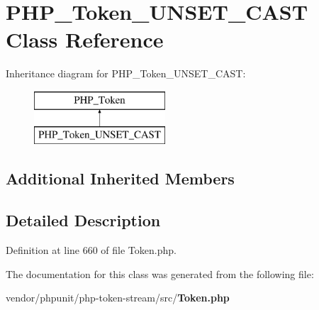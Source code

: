 \section{P\+H\+P\+\_\+\+Token\+\_\+\+U\+N\+S\+E\+T\+\_\+\+C\+A\+S\+T Class Reference}
\label{class_p_h_p___token___u_n_s_e_t___c_a_s_t}
Inheritance diagram for P\+H\+P\+\_\+\+Token\+\_\+\+U\+N\+S\+E\+T\+\_\+\+C\+A\+S\+T\+:\begin{figure}[H]
\begin{center}
\leavevmode
\includegraphics[height=2.000000cm]{class_p_h_p___token___u_n_s_e_t___c_a_s_t}
\end{center}
\end{figure}
\subsection*{Additional Inherited Members}


\subsection{Detailed Description}


Definition at line 660 of file Token.\+php.



The documentation for this class was generated from the following file\+:\begin{DoxyCompactItemize}
\item 
vendor/phpunit/php-\/token-\/stream/src/{\bf Token.\+php}\end{DoxyCompactItemize}
